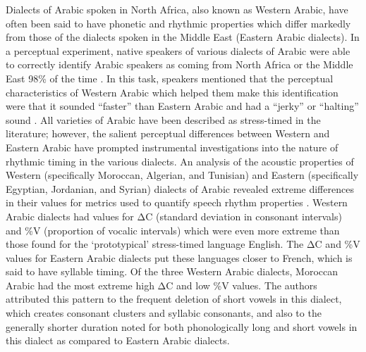   Dialects of Arabic spoken in North Africa, also known as Western Arabic, have often been said to have phonetic and rhythmic properties which differ markedly from those of the dialects spoken in the Middle East (Eastern Arabic dialects). In a perceptual experiment, native speakers of various dialects of Arabic were able to correctly identify Arabic speakers as coming from North Africa or the Middle East 98\% of the time \citep{BarkatEtAl1999}. In this task, speakers mentioned that the perceptual characteristics of Western Arabic which helped them make this identification were that it sounded “faster” than Eastern Arabic and had a “jerky” or “halting” sound \citep{GhazaliEtAl2002}. All varieties of Arabic have been described as stress-timed in the literature; however, the salient perceptual differences between Western and Eastern Arabic have prompted instrumental investigations into the nature of rhythmic timing in the various dialects. An analysis of the acoustic properties of Western (specifically Moroccan, Algerian, and Tunisian) and Eastern (specifically Egyptian, Jordanian, and Syrian) dialects of Arabic revealed extreme differences in their values for metrics used to quantify speech rhythm properties \citep{HamdiEtAl2004}. Western Arabic dialects had values for ΔC (standard deviation in consonant intervals) and \%V (proportion of vocalic intervals) which were even more extreme than those found for the ‘prototypical’ stress-timed language English. The ΔC and \%V values for Eastern Arabic dialects put these languages closer to French, which is said to have syllable timing. Of the three Western Arabic dialects, Moroccan Arabic had the most extreme high ΔC and low \%V values. The authors attributed this pattern to the frequent deletion of short vowels in this dialect, which creates consonant clusters and syllabic consonants, and also to the generally shorter duration noted for both phonologically long and short vowels in this dialect as compared to Eastern Arabic dialects.

